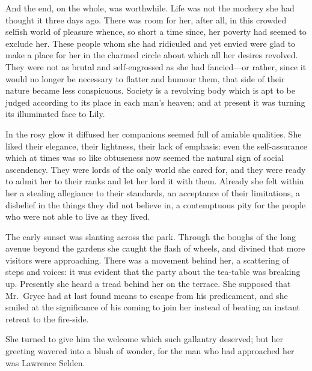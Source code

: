 \documentclass[12pt,a4paper]{book}
\begin{document}
And the end, on the whole, was worthwhile. Life was not the
mockery she had thought it three days ago. There was room for
her, after all, in this crowded selfish world of pleasure whence,
so short a time since, her poverty had seemed to exclude her. 
These people whom she had ridiculed and yet envied were glad to
make a place for her in the charmed circle about which all her
desires revolved. They were not as brutal and self-engrossed as
she had fancied---or rather, since it would no longer be
necessary to flatter and humour them, that side of their nature
became less conspicuous. Society is a revolving body which is apt
to be judged according to its place in each man's heaven; and at
present it was turning its illuminated face to Lily.





In the rosy glow it diffused her companions seemed full of
amiable qualities. She liked their elegance, their lightness,
their lack of emphasis: even the self-assurance which at times
was so like obtuseness now seemed the natural sign of social
ascendency. They were lords of the only world she cared for, and
they were ready to admit her to their ranks and let her lord it
with them. Already she felt within her a stealing allegiance to
their standards, an acceptance of their limitations, a disbelief
in the things they did not believe in, a contemptuous pity for
the people who were not able to live as they lived.





The early sunset was slanting across the park. Through the boughs
of the long avenue beyond the gardens she caught the flash of
wheels, and divined that more visitors were approaching. There
was a movement behind her, a scattering of steps and voices: it
was evident that the party about the tea-table was breaking up. 
Presently she heard a tread behind her on the terrace. She
supposed that Mr.\ Gryce had at last found means to escape from
his predicament, and she smiled at the significance of his coming
to join her instead of beating an instant retreat to the
fire-side.





She turned to give him the welcome which such gallantry deserved;
but her greeting wavered into a blush of wonder, for the man who
had approached her was Lawrence Selden.
\end{document}
